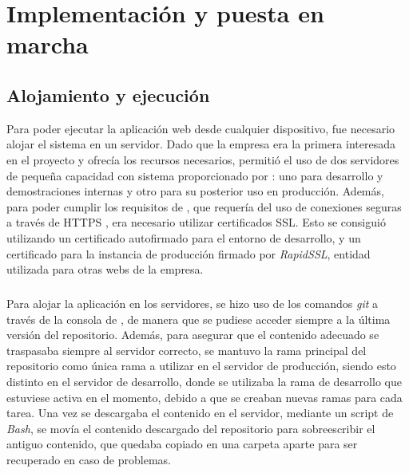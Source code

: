 \documentclass{subfiles}
\begin{document}
    \chapter{Implementación y puesta en marcha}
    \label{chap:5}

    \section{Alojamiento y ejecución}
    \label{sec:5.1}
    Para poder ejecutar la aplicación web desde cualquier dispositivo, fue necesario alojar el sistema en un servidor. Dado que la empresa \silverstorm era la primera interesada en el proyecto y ofrecía los recursos necesarios, permitió el uso de dos servidores de pequeña capacidad con sistema \linux proporcionado por \aws: uno para desarrollo y demostraciones internas y otro para su posterior uso en producción. Además, para poder cumplir los requisitos de \webxr, que requería del uso de conexiones seguras a través de HTTPS \cite{web:webxrrequirements}, era necesario utilizar certificados SSL. Esto se consiguió utilizando un certificado autofirmado para el entorno de desarrollo, y un certificado para la instancia de producción firmado por \textit{RapidSSL}, entidad utilizada para otras webs de la empresa.

    \paragraph{}
    Para alojar la aplicación en los servidores, se hizo uso de los comandos \textit{git} a través de la consola de \linux, de manera que se pudiese acceder siempre a la última versión del repositorio. Además, para asegurar que el contenido adecuado se traspasaba siempre al servidor correcto, se mantuvo la rama principal del repositorio como única rama a utilizar en el servidor de producción, siendo esto distinto en el servidor de desarrollo, donde se utilizaba la rama de desarrollo que estuviese activa en el momento, debido a que se creaban nuevas ramas para cada tarea. Una vez se descargaba el contenido en el servidor, mediante un script de \textit{Bash}, se movía el contenido descargado del repositorio para sobreescribir el antiguo contenido, que quedaba copiado en una carpeta aparte para ser recuperado en caso de problemas.
\end{document}
